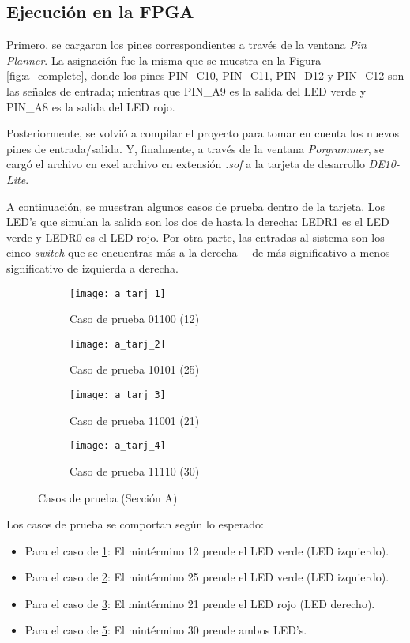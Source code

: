 \documentclass[../procedimientos.tex]{subfiles}
\begin{document}
\subsection{Ejecución en la FPGA}
Primero, se cargaron los pines correspondientes a través de la ventana 
\textit{Pin Planner}. La asignación fue la misma que se muestra en la Figura 
\ref{fig:a_complete}, donde los pines PIN\_C10, PIN\_C11, PIN\_D12 y PIN\_C12 
son las señales de entrada; mientras que PIN\_A9 es la salida del LED verde y 
PIN\_A8 es la salida del LED rojo.

Posteriormente, se volvió a compilar el proyecto para tomar en cuenta los 
nuevos pines de entrada/salida. Y, finalmente, a través de la ventana 
\textit{Porgrammer}, se cargó el archivo cn exel archivo cn extensión 
\textit{.sof} a la tarjeta de desarrollo \textit{DE10-Lite}.

A continuación, se muestran algunos casos de prueba dentro de la tarjeta. Los 
LED's que simulan la salida son los dos de hasta la derecha: LEDR1 es el LED 
verde y LEDR0 es el LED rojo. Por otra parte, las entradas al sistema son los 
cinco \textit{switch} que se encuentras más a la derecha ---de más 
significativo a menos significativo de izquierda a derecha.
\begin{figure}[H]
  \centering
  \begin{subfigure}[b]{0.45\textwidth}
    \centering
    \caption{Caso de prueba 01100 (12)}
    \label{fig:a_tarj_1}
    \texttt{[image: a\_tarj\_1]}
  \end{subfigure}
  \begin{subfigure}[b]{0.45\textwidth}
    \centering
    \caption{Caso de prueba 10101 (25)}
    \label{fig:a_tarj_2}
    \texttt{[image: a\_tarj\_2]}
  \end{subfigure}
  \begin{subfigure}[b]{0.45\textwidth}
    \centering
    \caption{Caso de prueba 11001 (21)}
    \label{fig:a_tarj_3}
    \texttt{[image: a\_tarj\_3]}
  \end{subfigure}
  \begin{subfigure}[b]{0.45\textwidth}
    \centering
    \caption{Caso de prueba 11110 (30)}
    \label{fig:a_tarj_4}
    \texttt{[image: a\_tarj\_4]}
  \end{subfigure}
  \caption{Casos de prueba (Sección A)}
\end{figure}

Los casos de prueba se comportan según lo esperado:
\begin{itemize}
  \item Para el caso de \ref{fig:a_tarj_1}: El mintérmino 12 prende el LED 
    verde (LED izquierdo).
  \item Para el caso de \ref{fig:a_tarj_2}: El mintérmino 25 prende el LED 
    verde (LED izquierdo).
  \item Para el caso de \ref{fig:a_tarj_3}: El mintérmino 21 prende el LED 
    rojo (LED derecho).
  \item Para el caso de \ref{fig:a_tarj_4}: El mintérmino 30 prende ambos 
    LED's.
\end{itemize}
\end{document}
